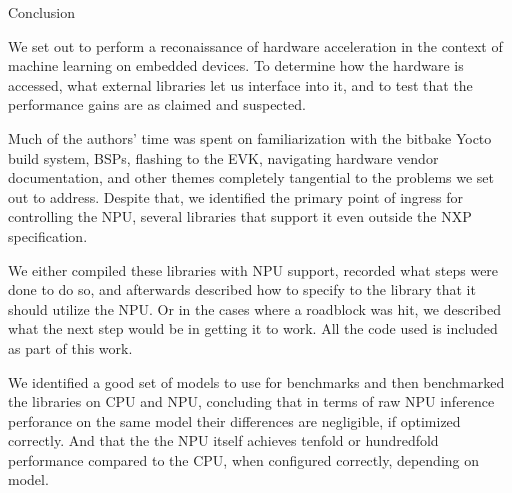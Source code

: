 
\chap Conclusion

We set out to perform a reconaissance of
hardware acceleration
in the context of machine learning on embedded devices.
To determine how the hardware is accessed,
what external libraries let us interface into it,
and to test that the performance gains are as claimed and suspected.

Much of the authors' time was spent
on familiarization with the bitbake Yocto build system,
BSPs,
flashing to the EVK,
navigating hardware vendor documentation,
and other themes completely tangential
to the problems we set out to address.
Despite that, we identified the primary
point of ingress for controlling the NPU,
several libraries that support it
even outside the NXP specification.

We either compiled these libraries with NPU support,
recorded what steps were done to do so,
and afterwards described how to specify to the library
that it should utilize the NPU.
Or in the cases where a roadblock was hit,
we described what the next step would
be in getting it to work.
All the code used is included
as part of this work.

We identified a good set of models to use for benchmarks
and then benchmarked the libraries on CPU and NPU,
concluding that in terms of raw NPU
inference perforance on the same model
their differences are negligible,
if optimized correctly.
And that the the NPU itself achieves
tenfold or hundredfold performance compared to the CPU,
when configured correctly,
depending on model.

